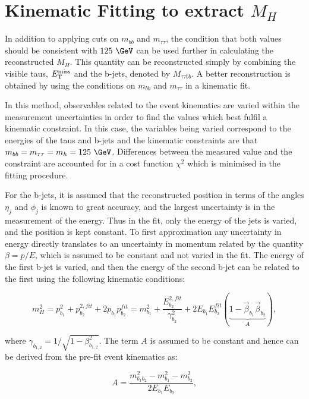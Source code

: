 \section{Kinematic Fitting to extract $M_{H}$}

In addition to applying cuts on $m_{bb}$ and $m_{\tau\tau}$, the condition that
both values should be consistent with $125~\GeV$ can be used further in
calculating the reconstructed $M_{H}$. This quantity can be reconstructed simply
by combining the visible taus, $E_{\mathrm{T}}^{\text{miss}}$ and the b-jets, denoted by $M_{\tau\tau bb}$.
A better reconstruction is obtained by using the conditions on $m_{bb}$ and
$m_{\tau\tau}$ in a kinematic fit. 

In this method, observables related to the
event kinematics are varied within the measurement uncertainties in order to
find the values which best fulfil a kinematic constraint. In this case, the
variables being varied correspond to the energies of the taus and b-jets and the
kinematic constraints are that $m_{bb} = m_{\tau\tau} = m_{h} = 125~\GeV$. Differences
between the measured value and the constraint are accounted for in a cost
function $\chi^{2}$ which is minimised in the fitting procedure.  

For the b-jets, it is assumed that the reconstructed position in terms of the
angles $\eta_{j}$ and $\phi_{j}$ is known to great accuracy, and the largest
uncertainty is in the measurement of the energy. Thus in the fit, only the
energy of the jets is varied, and the position is kept constant. To first
approximation any uncertainty in energy directly translates to an uncertainty in
momentum related by the quantity $\beta = p/E$, which is assumed to be constant and 
not varied in the fit. The energy of the first b-jet is varied, and then the
energy of the second b-jet can be related to the first using the following
kinematic conditions:

\begin{equation}
m_{H}^{2} = p_{b_{1}}^{2} + p_{b_{2}}^{2,fit} + 2p_{b_{1}}p_{b_{2}}^{fit} 
          = m_{b_{1}}^{2} + \frac{E_{b_{2}}^{2,fit}}{\gamma_{b_{2}}^{2}} +
          2E_{b_{1}}E_{b_{2}}^{fit}\left(\underbrace{1-\vec{\beta}_{b_{1}}\vec{\beta}_{b_{2}}}_{A}\right),   
\label{eq:bjetkinfit}         
\end{equation}

where $\gamma_{b_{1,2}} = 1/\sqrt{1-\beta_{b_{1,2}}^{2}}$. The term $A$ is
assumed to be constant and hence can be derived from the pre-fit event
kinematics as:

\begin{equation}
A = \frac{m_{b_{1}b_{2}}^{2} - m_{b_{1}}^{2} - m_{b_{2}}^{2}}{2E_{b_{1}}E_{b_{2}}} , 
\end{equation}

